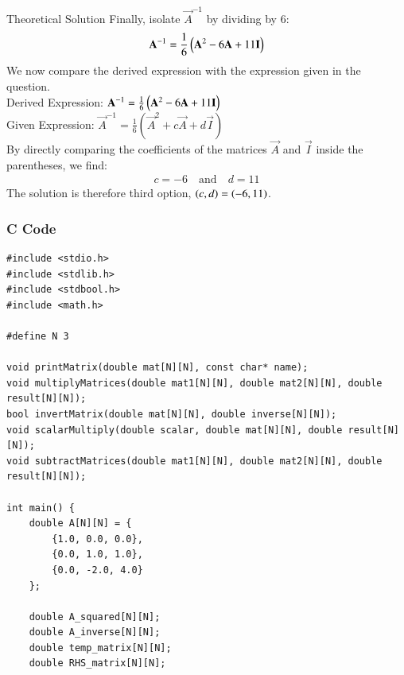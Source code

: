 \documentclass{beamer}
\begin{document}
\begin{frame}{Theoretical Solution}
Finally, isolate $\vec{A}^{-1}$ by dividing by 6:
\begin{align}
\mathbf{A}^{-1} = \frac{1}{6}\left(\mathbf{A}^2 - 6\mathbf{A} + 11\mathbf{I}\right)
\end{align}
We now compare the derived expression  with the expression given in the question.\\
Derived Expression: $\mathbf{A}^{-1} = \frac{1}{6}\left(\mathbf{A}^2 - 6\mathbf{A} + 11\mathbf{I}\right)$\\
Given Expression: $\vec{A}^{-1} = \frac{1}{6}(\vec{A}^2 + c\vec{A} + d\vec{I})$\\
By directly comparing the coefficients of the matrices $\vec{A}$ and $\vec{I}$ inside the parentheses, we find:
\begin{align}
c = -6 \quad \text{and} \quad d = 11
\end{align}
The solution is therefore third option, $\left(c, d\right) = \left(-6, 11\right)$.
\end{frame}

\begin{frame}[fragile]
    \frametitle{C Code }

    \begin{lstlisting}
#include <stdio.h>
#include <stdlib.h>
#include <stdbool.h>
#include <math.h>

#define N 3

void printMatrix(double mat[N][N], const char* name);
void multiplyMatrices(double mat1[N][N], double mat2[N][N], double result[N][N]);
bool invertMatrix(double mat[N][N], double inverse[N][N]);
void scalarMultiply(double scalar, double mat[N][N], double result[N][N]);
void subtractMatrices(double mat1[N][N], double mat2[N][N], double result[N][N]);

int main() {
    double A[N][N] = {
        {1.0, 0.0, 0.0},
        {0.0, 1.0, 1.0},
        {0.0, -2.0, 4.0}
    };

    double A_squared[N][N];
    double A_inverse[N][N];
    double temp_matrix[N][N];
    double RHS_matrix[N][N];

    \end{lstlisting}
\end{frame}
\end{document}
